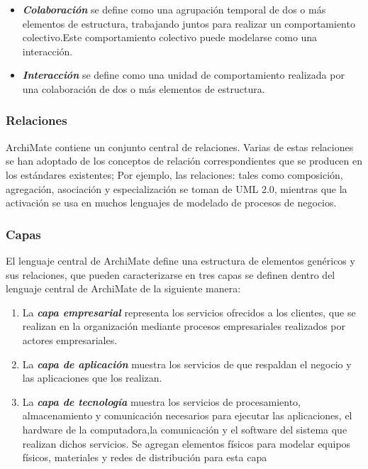 \begin{itemize}
\item \textbf{\textit{Colaboración}} se define como una agrupación temporal de dos o más elementos de estructura, trabajando juntos para realizar un comportamiento colectivo.Este comportamiento colectivo puede modelarse como una interacción.

\item \textbf{\textit{Interacción}} se define como una unidad de comportamiento realizada por una colaboración de dos o más elementos de estructura.
\end{itemize}

\subsubsection{Relaciones}
ArchiMate contiene un conjunto central de relaciones. Varias de estas relaciones se han adoptado de los conceptos de relación correspondientes que se producen en los estándares existentes; Por ejemplo, las relaciones: tales como composición, agregación, asociación y especialización se toman de UML 2.0, mientras que la activación se usa en muchos lenguajes de modelado de procesos de negocios.

\newpage

\subsubsection{Capas}
El lenguaje central de ArchiMate define una estructura de elementos genéricos y sus relaciones, que pueden caracterizarse en tres capas se definen dentro del lenguaje central de ArchiMate de la siguiente manera:

\begin{enumerate}
\item La \textbf{\textit{capa empresarial}} representa los servicios  ofrecidos a los clientes, que se realizan en la organización mediante procesos empresariales realizados por actores empresariales.

\item La \textbf{\textit{capa de aplicación}} muestra los servicios de  que respaldan el negocio y las aplicaciones que los realizan.

\item La \textbf{\textit{capa de tecnología}} muestra los servicios de procesamiento, almacenamiento y comunicación necesarios para ejecutar las aplicaciones, el hardware de la computadora,la comunicación y el software del sistema que realizan dichos servicios. Se agregan elementos físicos para modelar equipos físicos, materiales y redes de distribución para esta capa
\end{enumerate}

